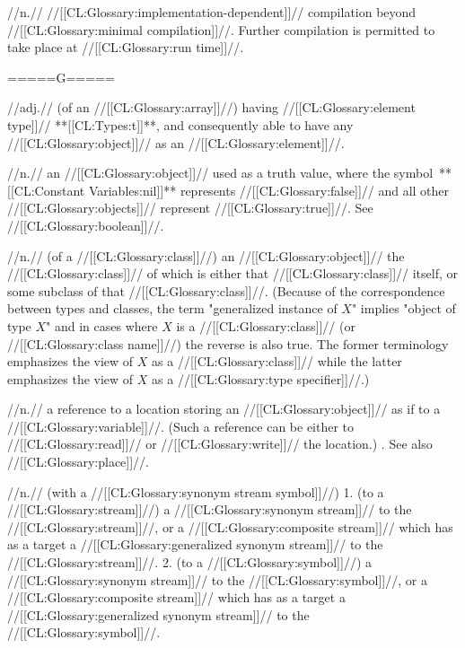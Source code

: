  //n.// //[[CL:Glossary:implementation-dependent]]// compilation beyond //[[CL:Glossary:minimal compilation]]//. Further compilation is permitted to take place at //[[CL:Glossary:run time]]//.  

=====G=====

 //adj.// (of an //[[CL:Glossary:array]]//) having //[[CL:Glossary:element type]]// **[[CL:Types:t]]**, and consequently able to have any //[[CL:Glossary:object]]// as an //[[CL:Glossary:element]]//.

 //n.// an //[[CL:Glossary:object]]// used as a truth value, where the symbol~**[[CL:Constant Variables:nil]]** represents //[[CL:Glossary:false]]// and all other //[[CL:Glossary:objects]]// represent //[[CL:Glossary:true]]//. See //[[CL:Glossary:boolean]]//.

 //n.// (of a //[[CL:Glossary:class]]//) an //[[CL:Glossary:object]]// the //[[CL:Glossary:class]]// of which is either that //[[CL:Glossary:class]]// itself, or some subclass of that //[[CL:Glossary:class]]//. (Because of the correspondence between types and classes, the term "generalized instance of $X$" implies "object of type $X$" and in cases where $X$ is a //[[CL:Glossary:class]]// (or //[[CL:Glossary:class name]]//) the reverse is also true. The former terminology emphasizes the view of $X$ as a //[[CL:Glossary:class]]// while the latter emphasizes the view of $X$ as a //[[CL:Glossary:type specifier]]//.)

 //n.// a reference to a location storing an //[[CL:Glossary:object]]// as if to a //[[CL:Glossary:variable]]//. (Such a reference can be either to //[[CL:Glossary:read]]// or //[[CL:Glossary:write]]// the location.) \Seesection\GeneralizedReference. See also //[[CL:Glossary:place]]//.

 //n.// (with a //[[CL:Glossary:synonym stream symbol]]//) 1. (to a //[[CL:Glossary:stream]]//) a //[[CL:Glossary:synonym stream]]// to the //[[CL:Glossary:stream]]//, or a //[[CL:Glossary:composite stream]]// which has as a target a //[[CL:Glossary:generalized synonym stream]]// to the //[[CL:Glossary:stream]]//. 2. (to a //[[CL:Glossary:symbol]]//) a //[[CL:Glossary:synonym stream]]// to the //[[CL:Glossary:symbol]]//, or a //[[CL:Glossary:composite stream]]// which has as a target a //[[CL:Glossary:generalized synonym stream]]// to the //[[CL:Glossary:symbol]]//.

